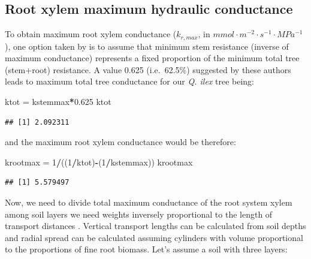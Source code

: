 \documentclass[]{book}
\newenvironment{Shaded}{\begin{snugshade}}{\end{snugshade}}
\newcommand{\DecValTok}[1]{\textcolor[rgb]{0.00,0.00,0.81}{#1}}
\newcommand{\FloatTok}[1]{\textcolor[rgb]{0.00,0.00,0.81}{#1}}
\newcommand{\StringTok}[1]{\textcolor[rgb]{0.31,0.60,0.02}{#1}}
\newcommand{\OperatorTok}[1]{\textcolor[rgb]{0.81,0.36,0.00}{\textbf{#1}}}
\newcommand{\NormalTok}[1]{#1}
\begin{document}
\subsection{Root xylem maximum hydraulic
conductance}\label{root-xylem-maximum-hydraulic-conductance}

To obtain maximum root xylem conductance (\(k_{r, max}\), in
\(mmol \cdot m^{-2} \cdot s^{-1} \cdot MPa^{-1}\)), one option taken by
\citet{Christoffersen2016} is to assume that minimum stem resistance
(inverse of maximum conductance) represents a fixed proportion of the
minimum total tree (stem+root) resistance. A value 0.625 (i.e.~62.5\%)
suggested by these authors leads to maximum total tree conductance for
our \emph{Q. ilex} tree being:

\begin{Shaded}
\begin{Highlighting}[]
\NormalTok{ktot =}\StringTok{ }\NormalTok{kstemmax}\OperatorTok{*}\FloatTok{0.625}
\NormalTok{ktot}
\end{Highlighting}
\end{Shaded}

\begin{verbatim}
## [1] 2.092311
\end{verbatim}

and the maximum root xylem conductance would be therefore:

\begin{Shaded}
\begin{Highlighting}[]
\NormalTok{krootmax =}\StringTok{ }\DecValTok{1}\OperatorTok{/}\NormalTok{((}\DecValTok{1}\OperatorTok{/}\NormalTok{ktot)}\OperatorTok{-}\NormalTok{(}\DecValTok{1}\OperatorTok{/}\NormalTok{kstemmax))}
\NormalTok{krootmax}
\end{Highlighting}
\end{Shaded}

\begin{verbatim}
## [1] 5.579497
\end{verbatim}

Now, we need to divide total maximum conductance of the root system
xylem among soil layers we need weights inversely proportional to the
length of transport distances \citep{Sperry2016}. Vertical transport
lengths can be calculated from soil depths and radial spread can be
calculated assuming cylinders with volume proportional to the
proportions of fine root biomass. Let's assume a soil with three layers:

\begin{Shaded}
\end{Shaded}
\end{document}
